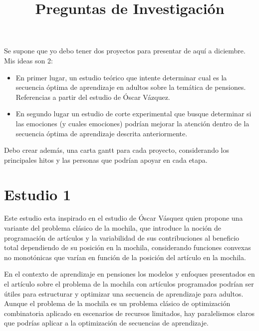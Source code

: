 \documentclass{article}
\date{}
\title{Preguntas de Investigación}
\begin{document}
\maketitle

Se supone que yo debo tener dos proyectos para presentar de aquí a diciembre. Mis ideas son 2: 

\begin{itemize}
    \item En primer lugar, un estudio teórico que intente determinar cual es la secuencia óptima de aprendizaje en adultos sobre la temática de pensiones. Referencias a partir del estudio de Óscar Vázquez. 

    \item En segundo lugar un estudio de corte experimental que busque determinar si las emociones (y cuales emociones) podrían mejorar la atención dentro de la secuencia óptima de aprendizaje descrita anteriormente. 
\end{itemize}

Debo crear además, una carta gantt para cada proyecto, considerando los principales hitos y las personas que podrían apoyar en cada etapa. 

\section{Estudio 1}

Este estudio esta inspirado en el estudio de Óscar Vásquez quien propone una variante del problema clásico de la mochila, que introduce la noción de programación de artículos y la variabilidad de sus contribuciones al beneficio total dependiendo de su posición en la mochila, considerando funciones convexas no monotónicas que varían en función de la posición del artículo en la mochila. 

En el contexto de aprendizaje en pensiones los modelos y enfoques presentados en el artículo sobre el problema de la mochila con artículos programados podrían ser útiles para estructurar y optimizar una secuencia de aprendizaje para adultos. Aunque el problema de la mochila es un problema clásico de optimización combinatoria aplicado en escenarios de recursos limitados, hay paralelismos claros que podrías aplicar a la optimización de secuencias de aprendizaje.
\end{document}
